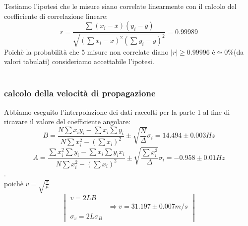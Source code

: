 \documentclass[a4paper]{article}
\theoremstyle{definition}
\begin{document}
\begin{figure}[!ht]
\end{figure}
\noindent Testiamo l'ipotesi che le misure siano correlate linearmente con il calcolo del coefficiente di correlazione lineare:
\[ r = \frac{\sum (x_{i}-\bar{x})(y_{i}-\bar{y})}{\sqrt{(\sum x_{i}-\bar{x})^{2}(\sum y_{i}-\bar{y})^{2}}} = 0.99989\]
\noindent Poichè la probabilità che 5 misure non correlate diano \(\left | r \right | \geq  0.99996\) è\(\simeq 0 \%\)(da valori tabulati) consideriamo accettabile l'ipotesi.\\\\

\subsubsection*{calcolo della velocità di propagazione}
\noindent Abbiamo eseguito l'interpolazione dei dati raccolti per la parte 1 al fine di ricavare il valore del coefficiente angolare:
\[B = \frac{N\sum x_{i}y_{i}-\sum x_{i}\sum y_{i}}{N\sum x_{i}^{2}-(\sum x_{i})^{2}} \pm \sqrt{\frac{N}{\Delta }}\sigma _{i} =14.494 \pm 0.003 Hz\]
\[A = \frac{\sum x_{i}^{2}\sum y_{i}-\sum x_{i}\sum y_{i}x_{i}}{N\sum x_{i}^{2}-(\sum x_{i})^{2}} \pm \sqrt{\frac{\sum x_{i}^{2}}{\Delta }}\sigma _{i} = -0.958 \pm 0.01 Hz\]
.\\
\noindent poichè \(v = \sqrt{\frac{\tau}{\mu}}\)
\[\begin{vmatrix}
	v = 2LB & \\ 
	& \Rightarrow v = 31.197 \pm 0.007 m/s\\ 
	\sigma _{v} = 2L\sigma _{B} & 
\end{vmatrix}\]
\end{document}
